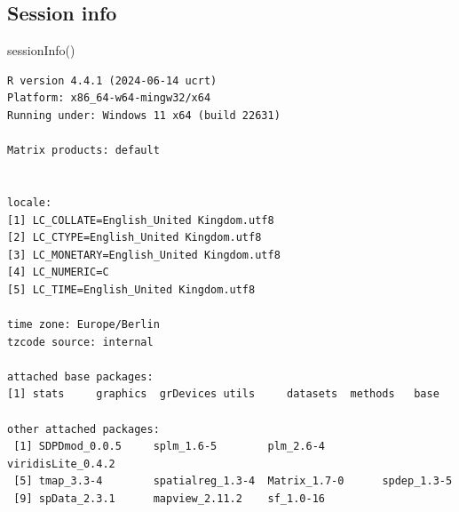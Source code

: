 \documentclass[
  letterpaper,
  DIV=11,
  numbers=noendperiod]{scrreprt}
\newenvironment{Shaded}{\begin{snugshade}}{\end{snugshade}}
\newcommand{\FunctionTok}[1]{\textcolor[rgb]{0.28,0.35,0.67}{#1}}
\newcommand{\NormalTok}[1]{\textcolor[rgb]{0.00,0.23,0.31}{#1}}
\begin{document}
\hypertarget{session-info-11}{%
\subsection*{Session info}\label{session-info-11}}

\begin{Shaded}
\begin{Highlighting}[]
\FunctionTok{sessionInfo}\NormalTok{()}
\end{Highlighting}
\end{Shaded}

\begin{verbatim}
R version 4.4.1 (2024-06-14 ucrt)
Platform: x86_64-w64-mingw32/x64
Running under: Windows 11 x64 (build 22631)

Matrix products: default


locale:
[1] LC_COLLATE=English_United Kingdom.utf8 
[2] LC_CTYPE=English_United Kingdom.utf8   
[3] LC_MONETARY=English_United Kingdom.utf8
[4] LC_NUMERIC=C                           
[5] LC_TIME=English_United Kingdom.utf8    

time zone: Europe/Berlin
tzcode source: internal

attached base packages:
[1] stats     graphics  grDevices utils     datasets  methods   base     

other attached packages:
 [1] SDPDmod_0.0.5     splm_1.6-5        plm_2.6-4         viridisLite_0.4.2
 [5] tmap_3.3-4        spatialreg_1.3-4  Matrix_1.7-0      spdep_1.3-5      
 [9] spData_2.3.1      mapview_2.11.2    sf_1.0-16        


\end{verbatim}
\end{document}
